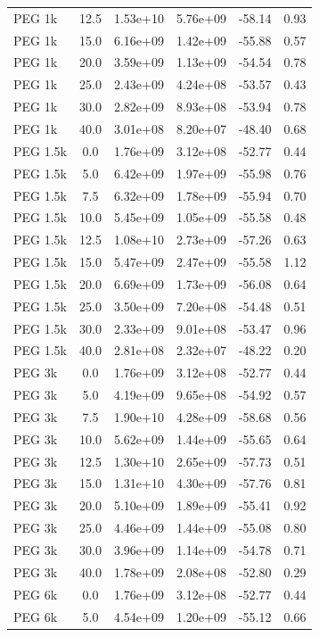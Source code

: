\begin{tabular}{lccccc}
PEG 1k & 12.5 & 1.53e+10 & 5.76e+09 & -58.14 & 0.93 \\
PEG 1k & 15.0 & 6.16e+09 & 1.42e+09 & -55.88 & 0.57 \\
PEG 1k & 20.0 & 3.59e+09 & 1.13e+09 & -54.54 & 0.78 \\
PEG 1k & 25.0 & 2.43e+09 & 4.24e+08 & -53.57 & 0.43 \\
PEG 1k & 30.0 & 2.82e+09 & 8.93e+08 & -53.94 & 0.78 \\
PEG 1k & 40.0 & 3.01e+08 & 8.20e+07 & -48.40 & 0.68 \\
PEG 1.5k & 0.0 & 1.76e+09 & 3.12e+08 & -52.77 & 0.44 \\
PEG 1.5k & 5.0 & 6.42e+09 & 1.97e+09 & -55.98 & 0.76 \\
PEG 1.5k & 7.5 & 6.32e+09 & 1.78e+09 & -55.94 & 0.70 \\
PEG 1.5k & 10.0 & 5.45e+09 & 1.05e+09 & -55.58 & 0.48 \\
PEG 1.5k & 12.5 & 1.08e+10 & 2.73e+09 & -57.26 & 0.63 \\
PEG 1.5k & 15.0 & 5.47e+09 & 2.47e+09 & -55.58 & 1.12 \\
PEG 1.5k & 20.0 & 6.69e+09 & 1.73e+09 & -56.08 & 0.64 \\
PEG 1.5k & 25.0 & 3.50e+09 & 7.20e+08 & -54.48 & 0.51 \\
PEG 1.5k & 30.0 & 2.33e+09 & 9.01e+08 & -53.47 & 0.96 \\
PEG 1.5k & 40.0 & 2.81e+08 & 2.32e+07 & -48.22 & 0.20 \\
PEG 3k & 0.0 & 1.76e+09 & 3.12e+08 & -52.77 & 0.44 \\
PEG 3k & 5.0 & 4.19e+09 & 9.65e+08 & -54.92 & 0.57 \\
PEG 3k & 7.5 & 1.90e+10 & 4.28e+09 & -58.68 & 0.56 \\
PEG 3k & 10.0 & 5.62e+09 & 1.44e+09 & -55.65 & 0.64 \\
PEG 3k & 12.5 & 1.30e+10 & 2.65e+09 & -57.73 & 0.51 \\
PEG 3k & 15.0 & 1.31e+10 & 4.30e+09 & -57.76 & 0.81 \\
PEG 3k & 20.0 & 5.10e+09 & 1.89e+09 & -55.41 & 0.92 \\
PEG 3k & 25.0 & 4.46e+09 & 1.44e+09 & -55.08 & 0.80 \\
PEG 3k & 30.0 & 3.96e+09 & 1.14e+09 & -54.78 & 0.71 \\
PEG 3k & 40.0 & 1.78e+09 & 2.08e+08 & -52.80 & 0.29 \\
PEG 6k & 0.0 & 1.76e+09 & 3.12e+08 & -52.77 & 0.44 \\
PEG 6k & 5.0 & 4.54e+09 & 1.20e+09 & -55.12 & 0.66 \\

\end{tabular}
